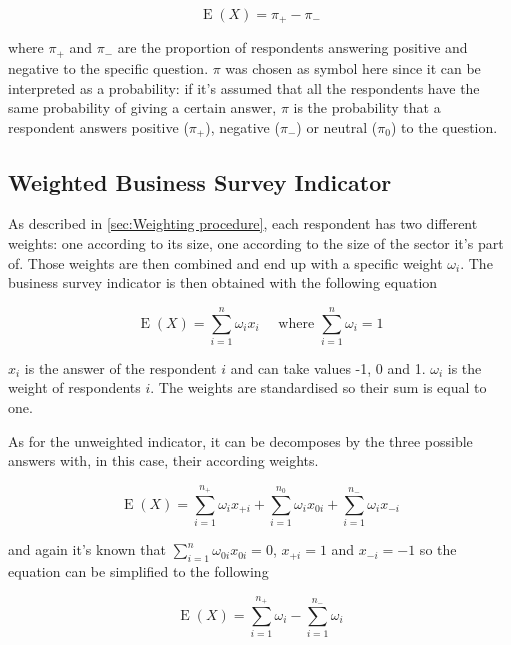 \documentclass[12pt,a4paper,oneside]{book}
\DeclareMathOperator{\E}{E}
\begin{document}
\begin{equation}
    \E(X) = \pi_+ - \pi_-  \label{eq: BSI Unweighted}
\end{equation}

where $\pi_+$ and $\pi_-$ are the proportion of respondents answering positive and negative to the specific question.
$\pi$ was chosen as symbol here since it can be interpreted as a probability: if it's assumed that all the respondents have the same probability of giving a certain answer, $\pi$ is the probability that a respondent answers positive ($\pi_+$), negative ($\pi_-$) or neutral ($\pi_0$) to the question. 


\subsection{Weighted Business Survey Indicator}

As described in \autoref{sec:Weighting procedure}, each respondent has two different weights: one according to its size, one according to the size of the sector it's part of. Those weights are then combined and end up with a specific weight $\omega_i$.
The business survey indicator is then obtained with the following equation 

\begin{equation}
    \E(X) = \sum_{i=1}^n \omega_i x_i  \quad \text{  where  } \sum_{i=1}^n \omega_i =  1
\end{equation} 

$x_i$ is the answer of the respondent $i$ and can take values -1, 0 and 1.
$\omega_i$ is the weight of respondents $i$. 
The weights are standardised so their sum is equal to one.

As for the unweighted indicator, it can be decomposes by the three possible answers with, in this case, their according weights.

\begin{equation}
    \E(X) = \sum_{i=1}^{n_+} \omega_{i} x_{+i} + \sum_{i=1}^{n_0} \omega_{i} x_{0i} + \sum_{i=1}^{n_-} \omega_{i} x_{-i}
 \end{equation}

and again it's known that $\sum_{i=1}^n \omega_{0i} x_{0i} = 0$, $x_{+i} = 1$ and $x_{-i}=-1$ so the equation can be simplified to the following

\begin{equation}
    \E(X) = \sum_{i=1}^{n_+} \omega_{i}  - \sum_{i=1}^{n_-} \omega_{i}
\end{equation}
\end{document}
